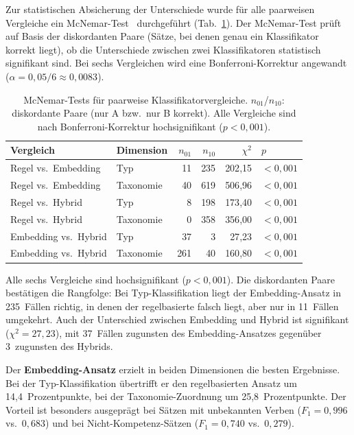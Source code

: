 Zur statistischen Absicherung der Unterschiede wurde für alle paarweisen Vergleiche ein McNemar-Test~\cite{mcnemar1947note} durchgeführt (Tab.~\ref{tab:mcnemar}).
Der McNemar-Test prüft auf Basis der diskordanten Paare (Sätze, bei denen genau ein Klassifikator korrekt liegt), ob die Unterschiede zwischen zwei Klassifikatoren statistisch signifikant sind.
Bei sechs Vergleichen wird eine Bonferroni-Korrektur angewandt ($\alpha = 0{,}05/6 \approx 0{,}0083$).

\begin{table}[H]
\caption{McNemar-Tests für paarweise Klassifikatorvergleiche. $n_{01}$/$n_{10}$: diskordante Paare (nur A bzw.\ nur B korrekt). Alle Vergleiche sind nach Bonferroni-Korrektur hochsignifikant ($p < 0{,}001$).\label{tab:mcnemar}}
\centering
\small
\begin{tabular}{llrrrl}
\hline
\textbf{Vergleich} & \textbf{Dimension} & $n_{01}$ & $n_{10}$ & $\chi^2$ & $p$ \\
\hline
Regel vs.\ Embedding & Typ & 11 & 235 & 202{,}15 & $< 0{,}001$ \\
Regel vs.\ Embedding & Taxonomie & 40 & 619 & 506{,}96 & $< 0{,}001$ \\
Regel vs.\ Hybrid & Typ & 8 & 198 & 173{,}40 & $< 0{,}001$ \\
Regel vs.\ Hybrid & Taxonomie & 0 & 358 & 356{,}00 & $< 0{,}001$ \\
Embedding vs.\ Hybrid & Typ & 37 & 3 & 27{,}23 & $< 0{,}001$ \\
Embedding vs.\ Hybrid & Taxonomie & 261 & 40 & 160{,}80 & $< 0{,}001$ \\
\hline
\end{tabular}
\end{table}

Alle sechs Vergleiche sind hochsignifikant ($p < 0{,}001$).
Die diskordanten Paare bestätigen die Rangfolge: Bei Typ-Klassifikation liegt der Embedding-Ansatz in 235~Fällen richtig, in denen der regelbasierte falsch liegt, aber nur in 11~Fällen umgekehrt.
Auch der Unterschied zwischen Embedding und Hybrid ist signifikant ($\chi^2 = 27{,}23$), mit 37~Fällen zugunsten des Embedding-Ansatzes gegenüber 3~zugunsten des Hybrids.

Der \textbf{Embedding-Ansatz} erzielt in beiden Dimensionen die besten Ergebnisse.
Bei der Typ-Klassifikation übertrifft er den regelbasierten Ansatz um 14{,}4~Prozentpunkte, bei der Taxonomie-Zuordnung um 25{,}8~Prozentpunkte.
Der Vorteil ist besonders ausgeprägt bei Sätzen mit unbekannten Verben ($F_1 = 0{,}996$ vs.\ $0{,}683$) und bei Nicht-Kompetenz-Sätzen ($F_1 = 0{,}740$ vs.\ $0{,}279$).

